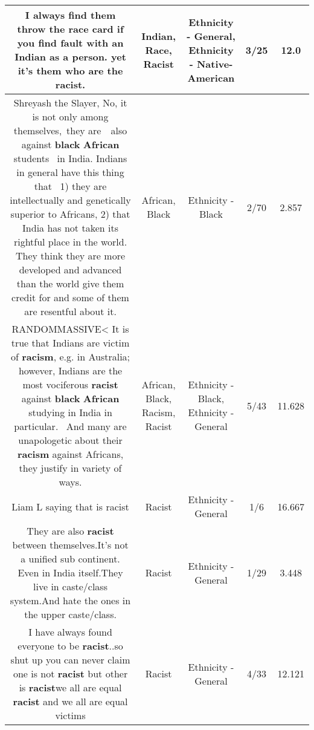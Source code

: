 \documentclass[11pt]{article}
\newlength\mylength
\begin{document}
\begin{center}
\begin{longtable}{|C{.65\mylength}|C{.30\mylength}|C{.12\mylength}|C{.12\mylength}|C{.12\mylength}|}
  \small I always find them throw the \textbf{race} card if you find fault with an \textbf{Indian} as a person. yet it's them who are the \textbf{racist}.\normalsize   & Indian, Race, Racist & Ethnicity - General, Ethnicity - Native-American & 3/25 & 12.0 \\  \hline
  \small Shreyash the Slayer, No, it is not only among themselves, they are  also against \textbf{black} \textbf{African} students  in India. Indians in general have this thing that  1) they are intellectually and genetically superior to Africans, 2) that India has not taken its rightful place in the world. They think they are more developed and advanced than the world give them credit for and some of them are resentful about it.\normalsize   & African, Black & Ethnicity - Black & 2/70 & 2.857 \\  \hline
  \small RANDOMMASSIVE< It is true that Indians are victim of \textbf{racism}, e.g. in Australia; however, Indians are the most vociferous \textbf{racist} against \textbf{black} \textbf{African} studying in India in particular.  And many are unapologetic about their \textbf{racism} against Africans, they justify in variety of ways.\normalsize   & African, Black, Racism, Racist & Ethnicity - Black, Ethnicity - General & 5/43 & 11.628 \\  \hline
  \small Liam L saying that is racist\normalsize   & Racist & Ethnicity - General & 1/6 & 16.667 \\  \hline
  \small They are also \textbf{racist} between themselves.It's not a unified sub continent. Even in India itself.They live in caste/class system.And hate the ones in the upper caste/class.\normalsize   & Racist & Ethnicity - General & 1/29 & 3.448 \\  \hline
  \small I have always found everyone to be \textbf{racist}..so shut up you can never claim one is not \textbf{racist} but other is \textbf{racist}we all are equal \textbf{racist} and we all are equal victims\normalsize   & Racist & Ethnicity - General & 4/33 & 12.121 \\  \hline

\end{longtable}
\end{center}
\end{document}
